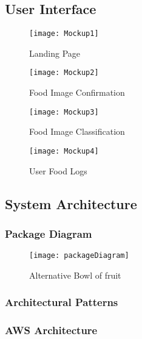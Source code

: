 
\subsection{User Interface}
\begin{figure}[ht] 
  \label{ fig7} 
  \begin{minipage}[b]{0.5\linewidth}
    \centering
    \texttt{[image: Mockup1]} 
    \caption{Landing Page} 
    \vspace{4ex}
  \end{minipage}%
  \begin{minipage}[b]{0.5\linewidth}
    \centering
    \texttt{[image: Mockup2]} 
    \caption{Food Image Confirmation} 
    \vspace{4ex}
  \end{minipage} 
  \begin{minipage}[b]{0.5\linewidth}
    \centering
    \texttt{[image: Mockup3]} 
    \caption{Food Image Classification} 
    \vspace{4ex}
  \end{minipage}%
  \begin{minipage}[b]{0.5\linewidth}
    \centering
    \texttt{[image: Mockup4]} 
    \caption{User Food Logs} 
    \vspace{4ex}
  \end{minipage} 
\end{figure}

\subsection{System Architecture}

\subsubsection*{Package Diagram}
\begin{figure}
    \texttt{[image: packageDiagram]}
    \caption{Alternative Bowl of fruit}
    \label{fig:newFruit}
\end{figure}

\subsubsection*{Architectural Patterns}

\subsubsection*{AWS Architecture}

